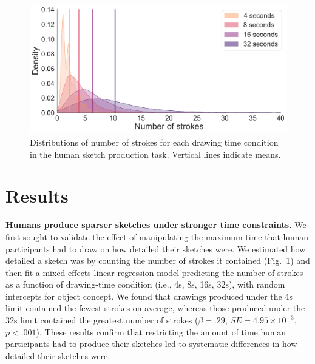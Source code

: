 \documentclass{article}
\begin{document}

\begin{figure}
    \centering
    \includegraphics[width=.5\textwidth]{neurips_figures/neuripsDB_stroke_complexity_by_dd_edited.pdf}
    \caption{Distributions of number of strokes for each drawing time condition in the human sketch production task. Vertical lines indicate means.}
    \label{fig:dd_v_numstrokes}
    \vspace{-1em}
\end{figure}

\section{Results}



\textbf{Humans produce sparser sketches under stronger time constraints.}
We first sought to validate the effect of manipulating the maximum time that human participants had to draw on how detailed their sketches were. 
We estimated how detailed a sketch was by counting the number of strokes it contained (Fig.~\ref{fig:dd_v_numstrokes}) and then fit a mixed-effects linear regression model predicting the number of strokes as a function of drawing-time condition (i.e., 4s, 8s, 16s, 32s), with random intercepts for object concept.
We found that drawings produced under the 4s limit contained the fewest strokes on average, whereas those produced under the 32s limit contained the greatest number of strokes ($\beta=.29$, $SE=4.95 \times10^{-3}$, $p<.001$).
These results confirm that restricting the amount of time human participants had to produce their sketches led to systematic differences in how detailed their sketches were.
\end{document}
